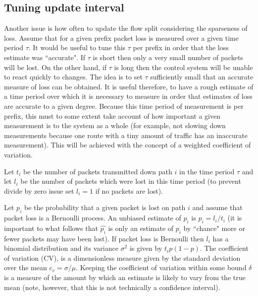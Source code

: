 \subsection{Tuning update interval}
Another issue is how often to update the flow split considering the sparseness of loss.
Assume that for a given prefix packet loss is measured over a given time period $\tau$.  
It would be useful to tune this $\tau$ per prefix in order that the loss estimate was ``accurate".  
If $\tau$ is short then only a very small number of packets will be lost.  
On the other hand, if $\tau$ is long then the control system will be unable to react quickly to changes.  
The idea is to set $\tau$ sufficiently small that an accurate measure of loss can be obtained.  
It is useful therefore, to have a rough estimate of a time period over which it is necessary to measure in order that estimates of loss are accurate to a given degree.  
Because this time period of measurement is per prefix, this must to some extent take account of how important a given measurement is to the system as a whole (for example, not slowing down measurements because one route with a tiny amount of traffic has an inaccurate measurement).  
This will be achieved with the concept of a weighted coefficient of variation.

Let $t_i$ be the number of packets transmitted down path $i$ in the time period $\tau$ and let $l_i$ be the number of packets which were lost in this time period (to prevent divide by zero issue set $l_i = 1$ if no packets are lost).

Let $p_i$ be the probability that a given packet is lost on path $i$ and assume that packet loss is a Bernoulli process.  
An unbiased estimate of $p_i$ is $\hat{p_i} = l_i/t_i$ (it is important to what follows that $\hat{p_i}$ is only an estimate of $p_i$ by ``chance" more or fewer packets may have been lost).  
If packet loss is Bernoulli then $l_i$ has a binomial distribution and its variance $\sigma^2$ is given by $t_i p(1-p)$.  
The coefficient of variation (CV), is a dimensionless measure given by the standard deviation over the mean $c_v= \sigma/\mu$.  
Keeping the coefficient of variation within some bound $\delta$ is a measure of the amount by which an estimate is likely to vary from the true mean (note, however, that this is not technically a confidence interval).

